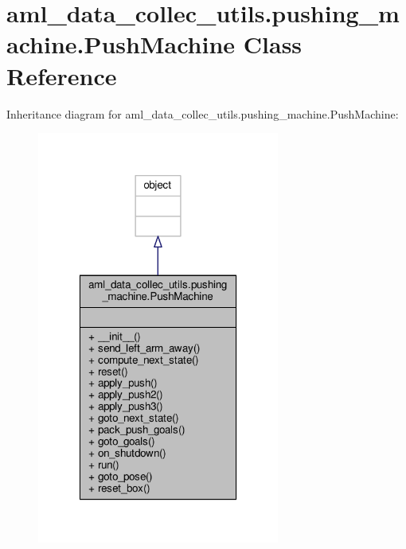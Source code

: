 \hypertarget{classaml__data__collec__utils_1_1pushing__machine_1_1_push_machine}{\section{aml\-\_\-data\-\_\-collec\-\_\-utils.\-pushing\-\_\-machine.\-Push\-Machine Class Reference}
\label{classaml__data__collec__utils_1_1pushing__machine_1_1_push_machine}
}


Inheritance diagram for aml\-\_\-data\-\_\-collec\-\_\-utils.\-pushing\-\_\-machine.\-Push\-Machine\-:
\nopagebreak
\begin{figure}[H]
\begin{center}
\leavevmode
\includegraphics[width=226pt]{classaml__data__collec__utils_1_1pushing__machine_1_1_push_machine__inherit__graph}
\end{center}
\end{figure}


